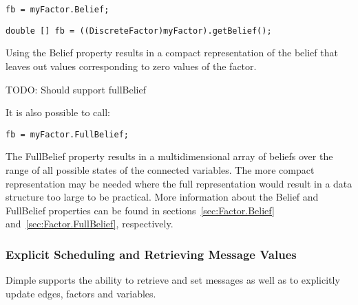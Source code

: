 \ifmatlab
\begin{lstlisting}
fb = myFactor.Belief;
\end{lstlisting}
\fi



\ifjava
\begin{lstlisting}
double [] fb = ((DiscreteFactor)myFactor).getBelief();
\end{lstlisting}

\fi

Using the Belief property results in a compact representation of the belief that leaves out values corresponding to zero values of the factor.  

\ifjava
TODO: Should support fullBelief
\fi

\ifmatlab

It is also possible to call:

\begin{lstlisting}
fb = myFactor.FullBelief;
\end{lstlisting}

The FullBelief property results in a multidimensional array of beliefs over the range of all possible states of the connected variables.  The more compact representation may be needed where the full representation would result in a data structure too large to be practical.  More information about the Belief and FullBelief properties can be found in sections~\ref{sec:Factor.Belief} and~\ref{sec:Factor.FullBelief}, respectively.
\fi
 
\subsubsection{Explicit Scheduling and Retrieving Message Values}

Dimple supports the ability to retrieve and set messages as well as to explicitly update edges, factors and variables.

